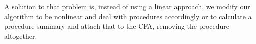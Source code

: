 \documentclass[11pt, a4paper, BCOR=10mm, ngerman, oneside]{scrbook}
\begin{document}
A solution to that problem is, instead of using a linear approach, we modify our algorithm to be nonlinear and deal with procedures accordingly \cite{DBLP:conf/sat/HoderB12} or to calculate a procedure summary and attach that to the CFA, removing the procedure altogether.
%

%
%
\end{document}
